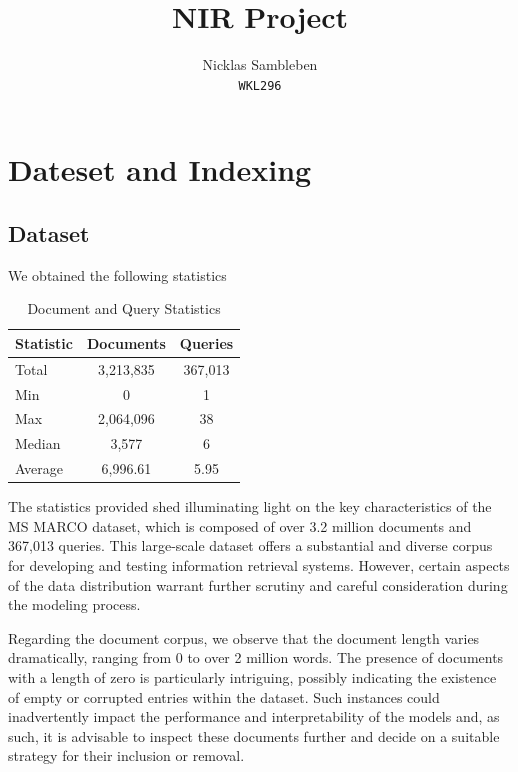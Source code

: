 \documentclass[11pt,a4paper]{article}
\title{NIR Project}
\author{Nicklas Sambleben \\
  \texttt{WKL296} \\ }
\date{}
\begin{document}
\maketitle

\section{Dateset and Indexing}

\subsection*{Dataset}
We obtained the following statistics 

\begin{table}[htbp]
    \centering
    \label{tab:statistics}
    \begin{tabular}{lcc}
        \toprule
        \multicolumn{1}{c}{\textbf{Statistic}} & \multicolumn{1}{c}{\textbf{Documents}} & \multicolumn{1}{c}{\textbf{Queries}} \\
        \midrule
        Total   & 3,213,835 & 367,013 \\
        Min     & 0         & 1 \\
        Max     & 2,064,096 & 38 \\
        Median  & 3,577     & 6 \\
        Average & 6,996.61  & 5.95 \\
        \bottomrule
    \end{tabular}
    \caption{Document and Query Statistics}
\end{table}



The statistics provided shed illuminating light on the key
characteristics of the MS MARCO dataset, which is composed of over
3.2 million documents and 367,013 queries. This large-scale dataset
offers a substantial and diverse corpus for developing and testing
information retrieval systems. However, certain aspects of the data
distribution warrant further scrutiny and careful consideration
during the modeling process.

Regarding the document corpus, we observe that the document length
varies dramatically, ranging from 0 to over 2 million words. The
presence of documents with a length of zero is particularly
intriguing, possibly indicating the existence of empty or corrupted
entries within the dataset. Such instances could inadvertently impact
the performance and interpretability of the models and, as such, it
is advisable to inspect these documents further and decide on a
suitable strategy for their inclusion or removal.
\end{document}
